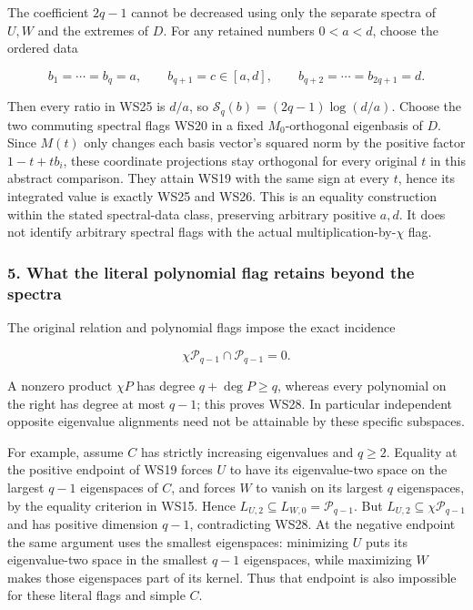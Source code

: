 The coefficient \(2q-1\) cannot be decreased using only the separate spectra of \(U,W\) and the extremes of \(D\). For any retained numbers \(0<a<d\), choose the ordered data

\[
b_1=\cdots=b_q=a,
\qquad b_{q+1}=c\in[a,d],
\qquad b_{q+2}=\cdots=b_{2q+1}=d.
\tag{WS27}
\]

Then every ratio in WS25 is \(d/a\), so \(\mathscr S_q(b)=(2q-1)\log(d/a)\). Choose the two commuting spectral flags WS20 in a fixed \(M_0\)-orthogonal eigenbasis of \(D\). Since \(M(t)\) only changes each basis vector's squared norm by the positive factor \(1-t+tb_i\), these coordinate projections stay orthogonal for every original \(t\) in this abstract comparison. They attain WS19 with the same sign at every \(t\), hence its integrated value is exactly WS25 and WS26. This is an equality construction within the stated spectral-data class, preserving arbitrary positive \(a,d\). It does not identify arbitrary spectral flags with the actual multiplication-by-\(\chi\) flag.

\subsubsection{5. What the literal polynomial flag retains beyond the spectra}\label{endpoint-window_review--what-the-literal-polynomial-flag-retains-beyond-the-spectra}

The original relation and polynomial flags impose the exact incidence

\[
\chi\mathcal P_{q-1}\cap\mathcal P_{q-1}=0.
\tag{WS28}
\]

A nonzero product \(\chi P\) has degree \(q+\deg P\ge q\), whereas every polynomial on the right has degree at most \(q-1\); this proves WS28. In particular independent opposite eigenvalue alignments need not be attainable by these specific subspaces.

For example, assume \(C\) has strictly increasing eigenvalues and \(q\ge2\). Equality at the positive endpoint of WS19 forces \(U\) to have its eigenvalue-two space on the largest \(q-1\) eigenspaces of \(C\), and forces \(W\) to vanish on its largest \(q\) eigenspaces, by the equality criterion in WS15. Hence \(L_{U,2}\subseteq L_{W,0}=\mathcal P_{q-1}\). But \(L_{U,2}\subseteq\chi\mathcal P_{q-1}\) and has positive dimension \(q-1\), contradicting WS28. At the negative endpoint the same argument uses the smallest eigenspaces: minimizing \(U\) puts its eigenvalue-two space in the smallest \(q-1\) eigenspaces, while maximizing \(W\) makes those eigenspaces part of its kernel. Thus that endpoint is also impossible for these literal flags and simple \(C\).

